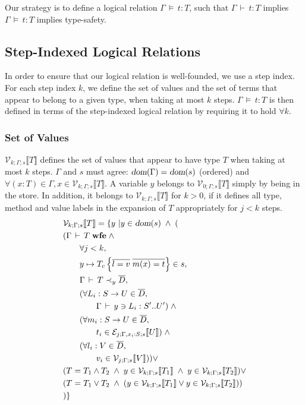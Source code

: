 \documentclass[9pt]{sigplanconf}
\newcommand{\gap}{\quad\quad}
\newcommand{\ts}{\,\vdash\,}
\newcommand{\dom}{\mbox{\sl dom}}
\newcommand{\expand}{\prec}
\newcommand{\typ}{:}
\newcommand{\wfe}{\;\mbox{\textbf{wfe}}}
\newcommand{\tand}{\wedge}
\newcommand{\tor}{\vee}
\newcommand{\ldefs}[1]{\left\{#1\right\}}
\newcommand{\seq}[1]{\overline{#1}}
\newcommand{\envplus}[1]{, #1}
\newcommand{\relv}[4]{\mathcal{V}_{#1;#2;#3}\llbracket#4\rrbracket}
\newcommand{\rele}[4]{\mathcal{E}_{#1;#2;#3}\llbracket#4\rrbracket}
\newcommand{\andl}{\;\wedge\;}
\newcommand{\orl}{\vee}
\newcommand{\ds}{\,\vDash\,}
\begin{document}
Our strategy is to define a logical relation $\Gamma \ds t : T$, such
that $\Gamma \ts t : T$ implies $\Gamma \ds t : T$ implies
type-safety.

\subsection{Step-Indexed Logical Relations}

In order to ensure that our logical relation is well-founded, we use a
step index. For each step index $k$, we define the set of values and
the set of terms that appear to belong to a given type, when taking at
most $k$ steps. $\Gamma \ds t : T$ is then defined in terms of the
step-indexed logical relation by requiring it to hold $\forall k$.

\subsubsection{Set of Values}
$\relv k \Gamma s T$ defines the set of values that appear to have
type $T$ when taking at most $k$ steps. $\Gamma$ and $s$ must agree:
$\dom(\Gamma) = \dom(s)$ (ordered) and $\forall (x : T) \in \Gamma, x
\in \relv k \Gamma s T$. A variable $y$ belongs to $\relv 0 \Gamma s
T$ simply by being in the store. In addition, it belongs to $\relv k
\Gamma s T$ for $k > 0$, if it defines all type, method and value labels in
the expansion of $T$ appropriately for $j < k$ steps.
\begin{align*}
&\relv k \Gamma s T = \{ y \ | y \in \dom(s) \andl (\\
& (\Gamma \ts T \wfe \andl\\
&\gap \forall j < k,\\
&\gap y \mapsto T_c \ldefs{\seq{l = v}\;\seq{m(x)=t}} \in s,\\
&\gap \Gamma \ts T \expand_y \seq{D},\\
&\gap (\forall L_i : S \rightarrow U \in \seq{D},\\
&\gap\gap \Gamma \ts y \ni L_i \typ {S'..U'}) \andl\\
&\gap (\forall m_i : S \rightarrow U \in \seq{D},\\
&\gap\gap t_i \in \rele j {\Gamma \envplus{x_i : S}} s U) \andl\\
&\gap (\forall l_i : V \in \seq{D},\\
&\gap\gap v_i \in \relv j \Gamma s V)) \orl\\
& (T = T_1 \tand T_2 \andl y \in \relv k \Gamma s {T_1} \andl y \in \relv k \Gamma s {T_2}) \orl\\
& (T = T_1 \tor T_2 \andl  (y \in \relv k \Gamma s {T_1} \orl y \in \relv k \Gamma s {T_2}))\\
&)\}
\end{align*}
\end{document}

